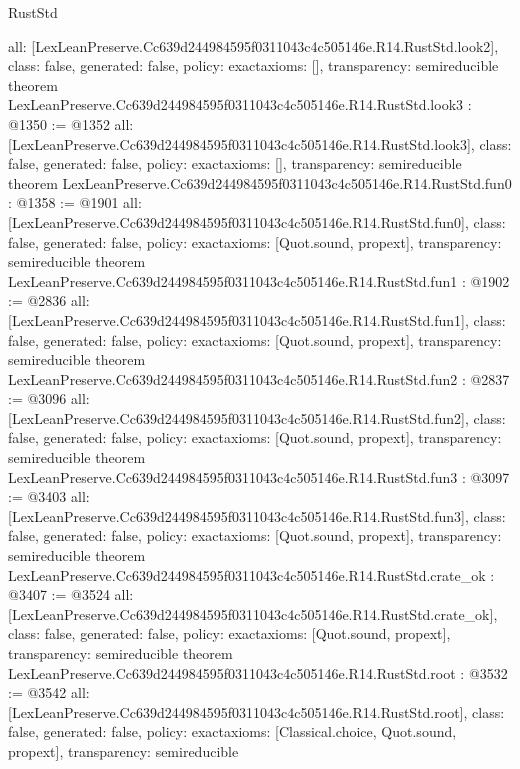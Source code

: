 \begin{lexlean}{RustStd}
\begin{coremodule}
{  all: [LexLeanPreserve.Cc639d244984595f0311043c4c505146e.R14.RustStd.look2],
  class: false,
  generated: false,
  policy: exact{axioms: []},
  transparency: semireducible
}
theorem LexLeanPreserve.Cc639d244984595f0311043c4c505146e.R14.RustStd.look3 : @1350 := @1352 {
  all: [LexLeanPreserve.Cc639d244984595f0311043c4c505146e.R14.RustStd.look3],
  class: false,
  generated: false,
  policy: exact{axioms: []},
  transparency: semireducible
}
theorem LexLeanPreserve.Cc639d244984595f0311043c4c505146e.R14.RustStd.fun0 : @1358 := @1901 {
  all: [LexLeanPreserve.Cc639d244984595f0311043c4c505146e.R14.RustStd.fun0],
  class: false,
  generated: false,
  policy: exact{axioms: [Quot.sound, propext]},
  transparency: semireducible
}
theorem LexLeanPreserve.Cc639d244984595f0311043c4c505146e.R14.RustStd.fun1 : @1902 := @2836 {
  all: [LexLeanPreserve.Cc639d244984595f0311043c4c505146e.R14.RustStd.fun1],
  class: false,
  generated: false,
  policy: exact{axioms: [Quot.sound, propext]},
  transparency: semireducible
}
theorem LexLeanPreserve.Cc639d244984595f0311043c4c505146e.R14.RustStd.fun2 : @2837 := @3096 {
  all: [LexLeanPreserve.Cc639d244984595f0311043c4c505146e.R14.RustStd.fun2],
  class: false,
  generated: false,
  policy: exact{axioms: [Quot.sound, propext]},
  transparency: semireducible
}
theorem LexLeanPreserve.Cc639d244984595f0311043c4c505146e.R14.RustStd.fun3 : @3097 := @3403 {
  all: [LexLeanPreserve.Cc639d244984595f0311043c4c505146e.R14.RustStd.fun3],
  class: false,
  generated: false,
  policy: exact{axioms: [Quot.sound, propext]},
  transparency: semireducible
}
theorem LexLeanPreserve.Cc639d244984595f0311043c4c505146e.R14.RustStd.crate_ok : @3407 := @3524 {
  all: [LexLeanPreserve.Cc639d244984595f0311043c4c505146e.R14.RustStd.crate_ok],
  class: false,
  generated: false,
  policy: exact{axioms: [Quot.sound, propext]},
  transparency: semireducible
}
theorem LexLeanPreserve.Cc639d244984595f0311043c4c505146e.R14.RustStd.root : @3532 := @3542 {
  all: [LexLeanPreserve.Cc639d244984595f0311043c4c505146e.R14.RustStd.root],
  class: false,
  generated: false,
  policy: exact{axioms: [Classical.choice, Quot.sound, propext]},
  transparency: semireducible
}


\end{coremodule}
\end{lexlean}
